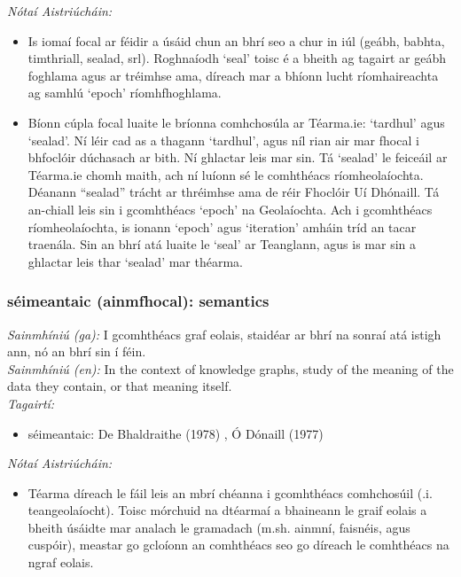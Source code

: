  \noindent \textit{Nótaí Aistriúcháin:}
\begin{itemize}
	\item Is iomaí focal ar féidir a úsáid chun an bhrí seo a chur in iúl (geábh, babhta, timthriall, sealad, srl). Roghnaíodh `seal' toisc é a bheith ag tagairt ar geábh foghlama agus ar tréimhse ama, díreach mar a bhíonn lucht ríomhaireachta ag samhlú `epoch' ríomhfhoghlama.
	\item Bíonn cúpla focal luaite le bríonna comhchosúla ar Téarma.ie: `tardhul' agus `sealad'. Ní léir cad as a thagann `tardhul', agus níl rian air mar fhocal i bhfoclóir dúchasach ar bith. Ní ghlactar leis mar sin. Tá `sealad' le feiceáil ar Téarma.ie chomh maith, ach ní luíonn sé le comhthéacs ríomheolaíochta. Déanann “sealad” trácht ar thréimhse ama de réir Fhoclóir Uí Dhónaill. Tá an-chiall leis sin i gcomhthéacs `epoch' na Geolaíochta. Ach i gcomhthéacs ríomheolaíochta, is ionann `epoch' agus `iteration' amháin tríd an tacar traenála. Sin an bhrí atá luaite le `seal' ar Teanglann, agus is mar sin a ghlactar leis thar `sealad' mar théarma.
\end{itemize}


\subsubsection*{séimeantaic (ainmfhocal): semantics}
 \noindent \textit{Sainmhíniú (ga):} I gcomhthéacs graf eolais, staidéar ar bhrí na sonraí atá istigh ann, nó an bhrí sin í féin.
\\
 \noindent \textit{Sainmhíniú (en):} In the context of knowledge graphs, study of the meaning of the data they contain, or that meaning itself.
\\
 \noindent \textit{Tagairtí:}
\begin{itemize}
	\item séimeantaic: De Bhaldraithe (1978) \cite{de-bhaldraithe}, Ó Dónaill (1977) \cite{odonaill}
\end{itemize}

 \noindent \textit{Nótaí Aistriúcháin:}
\begin{itemize}
	\item Téarma díreach le fáil leis an mbrí chéanna i gcomhthéacs comhchosúil (.i. teangeolaíocht). Toisc mórchuid na dtéarmaí a bhaineann le graif eolais a bheith úsáidte mar analach le gramadach (m.sh. ainmní, faisnéis, agus cuspóir), meastar go gcloíonn an comhthéacs seo go díreach le comhthéacs na ngraf eolais.
\end{itemize}


